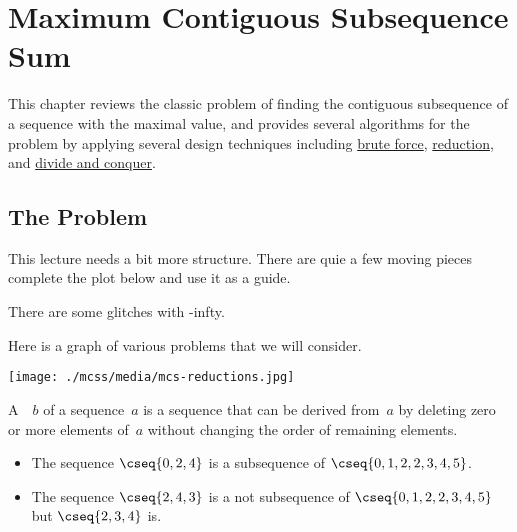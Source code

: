 \chapter{Maximum Contiguous Subsequence Sum}
\label{ch:mcss}

\begin{preamble}
This chapter reviews the classic problem of finding the contiguous
subsequence of a sequence with the maximal value, 
%
and provides several algorithms for the problem by applying several design techniques including
\href{sec:design::bf}{brute force},
%
\href{sec:design::reduction}{reduction}, and
%
\href{ch:design::dc}{divide and conquer}.
%

\end{preamble}


\section{The Problem}
\label{sec:mcss::problem}

\begin{teachnote}
This lecture needs a bit more structure.  There are quie a few moving
pieces complete the plot below and use it as a guide.  

There are some glitches with -infty.  
\end{teachnote}

\begin{teachnote}

Here is a graph of various problems that we will consider.

\texttt{[image: ./mcss/media/mcs-reductions.jpg]}

\end{teachnote}

\begin{flex}
\begin{definition}[Subsequence]
\label{def:mcss::introduction::subseq}

A~~$b$ of a sequence~$a$ is a sequence that can be
derived from~$a$ by deleting zero or more elements of~$a$ without changing the
order of remaining elements. 
%
\end{definition}

\begin{example}
\begin{itemize}

\item
The sequence $\cseq{0,2,4}$ is a subsequence of
$\cseq{0,1,2,2,3,4,5}$.

\item
The sequence $\cseq{2,4,3}$ is a not
subsequence of $\cseq{0,1,2,2,3,4,5}$ but $\cseq{2,3,4}$ is.
\end{itemize}
%
\end{example}
\end{flex}


